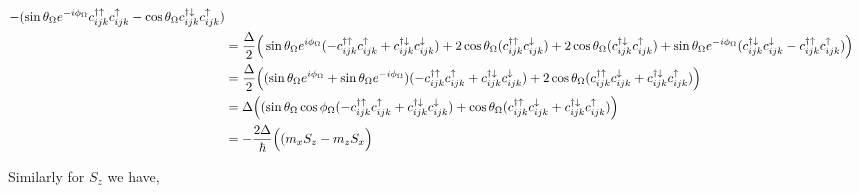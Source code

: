 \documentclass[10pt,prb,showpacs,amssymb,floatfix]{revtex4-1}
\newcommand{\dg}{\dagger}
\newcommand{\dna}{\downarrow}
\newcommand{\nn}{\nonumber}
\newcommand{\upa}{\uparrow}
\newcommand{\Dlt}{\Delta}
\newcommand{\Og}{\Omega}
\begin{document}
\begin{align}
- (  \sin\theta_\Og e^{-i\phi_\Og} c_{ijk}^{\dagger \uparrow} c_{ijk}^\uparrow - \cos\theta_\Og  c_{ijk}^{\dagger \downarrow} c_{ijk}^\uparrow ) \nn\\
& = \frac{\Dlt}{2} \Big{(} \sin\theta_\Og e^{i\phi_\Og} ( -c_{ijk}^{\dg\upa} c_{ijk}^{\upa} + c_{ijk}^{\dg\dna} c_{ijk}^{\dna})   + 2\cos\theta_\Og  (c_{ijk}^{\dg\upa} c_{ijk}^{\dna} )  + 2 \cos\theta_\Og ( c_{ijk}^{\dagger \dna} c_{ijk}^\uparrow ) +  \sin\theta_\Og e^{-i\phi_\Og} ( c_{ijk}^{\dagger \dna} c_{ijk}^\dna
-  c_{ijk}^{\dagger \uparrow} c_{ijk}^\uparrow)  \Big{)} \nn\\
&=  \frac{\Dlt}{2} \Big{(} (\sin\theta_\Og e^{i\phi_\Og} +  \sin\theta_\Og e^{-i\phi_\Og}  )  ( -c_{ijk}^{\dg\upa} c_{ijk}^{\upa} + c_{ijk}^{\dg\dna} c_{ijk}^{\dna})   + 2\cos\theta_\Og  (c_{ijk}^{\dg\upa} c_{ijk}^{\dna} +  c_{ijk}^{\dagger \dna} c_{ijk}^\uparrow)     \Big{)} \nn\\
&=  \Dlt \Big{(} ( \sin\theta_\Og \cos \phi_\Og     ( -c_{ijk}^{\dg\upa} c_{ijk}^{\upa} + c_{ijk}^{\dg\dna} c_{ijk}^{\dna})   + \cos\theta_\Og  (c_{ijk}^{\dg\upa} c_{ijk}^{\dna} +  c_{ijk}^{\dagger \dna} c_{ijk}^\uparrow)     \Big{)} \nn\\
&= -\frac{2\Dlt}{\hbar} \Big{(} ( m_x  S_z   - m_z  S_x     \Big{)}
\end{align}

Similarly for $S_z$ we have,
\end{document}
